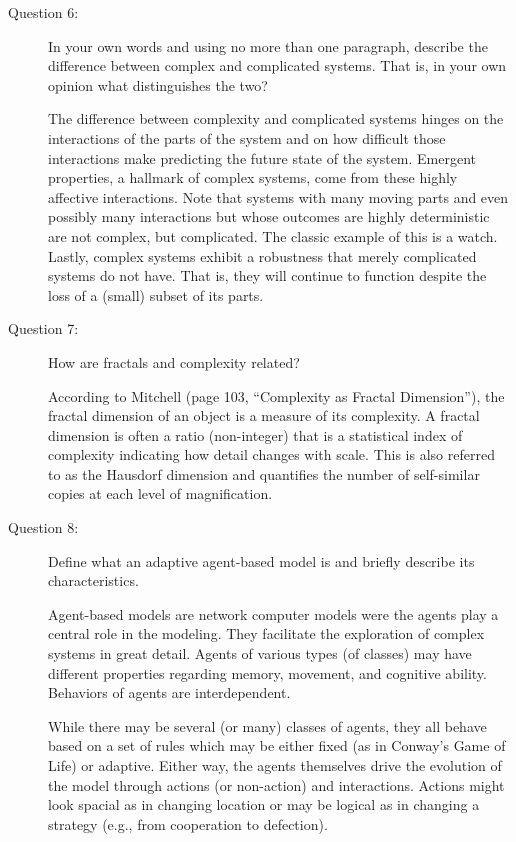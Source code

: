 \documentclass[letterpaper,10pt]{article}
\begin{document}
\begin{description}

\item[Question 6:]
  In your own words and using no more than one paragraph, describe the difference between complex and complicated systems.  That is, in your own opinion what distinguishes the two?

  The difference between complexity and complicated systems hinges on the interactions of the parts of the system and on how difficult those interactions make predicting the future state of the system.  Emergent properties, a hallmark of complex systems, come from these highly affective interactions.  Note that systems with many moving parts and even possibly many interactions but whose outcomes are highly deterministic are not complex, but complicated.  The classic example of
  this is a watch.  Lastly, complex systems exhibit a robustness that merely complicated systems do not have.  That is, they will continue to function despite the loss of a (small) subset of its parts.

\item[Question 7:]
How are fractals and complexity related?

According to Mitchell (page 103, ``Complexity as Fractal Dimension''), the fractal dimension of an object is a measure of its complexity.  A fractal dimension is often a ratio (non-integer) that is a statistical index of complexity indicating how detail changes with scale.  This is also referred to as the Hausdorf dimension and quantifies the number of self-similar copies at each level of magnification.

\item[Question 8:]
Define what an adaptive agent-based model is and briefly describe its characteristics.

Agent-based models are network computer models  were the agents play a central role in the modeling. They facilitate the exploration of complex systems in great detail.  Agents of various types (of classes) may have different properties regarding memory, movement, and cognitive ability.  Behaviors of agents are interdependent.

While there may be several (or many) classes of agents, they all behave based on a set of rules which may be either fixed (as in Conway's Game of Life) or adaptive.  Either way, the agents themselves drive the evolution of the model through actions (or non-action) and interactions.  Actions might look spacial as in changing location or may be logical as in changing a strategy (e.g., from cooperation to defection).


\end{description}
\end{document}

